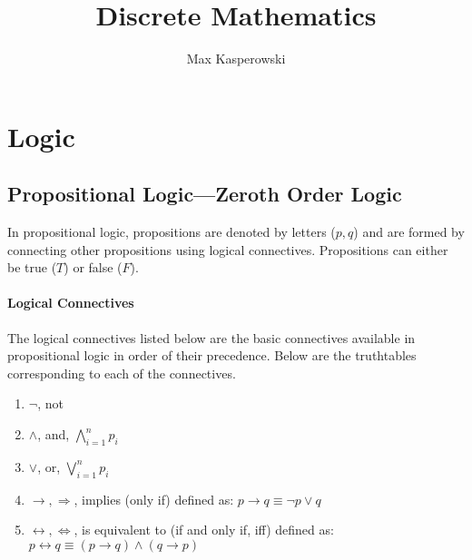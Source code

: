 \documentclass[a4paper, 10pt]{article}
\title{Discrete Mathematics}
\author{Max Kasperowski}
\begin{document}
\maketitle
\tableofcontents

\newpage
\section{Logic}

\subsection[Propositional Logic]{Propositional Logic{\large ---Zeroth Order Logic}}
In propositional logic, propositions are denoted by letters (\(p, q\)) and are formed by connecting other propositions using logical connectives. Propositions can either be true (\(T\)) or false (\(F\)).
\paragraph{Logical Connectives}
The logical connectives listed below are the basic connectives available in propositional logic in order of their precedence. Below are the truthtables corresponding to each of the connectives.
\begin{enumerate}
    \item \( \neg \), not
    \item \( \land \), and, \( \bigwedge\limits_{i=1}^n p_i \)
    \item \( \lor \), or, \( \bigvee\limits_{i=1}^n p_i \)
    \item \( \rightarrow ,\Rightarrow \), implies (only if) defined as: \( p\rightarrow q \equiv \neg p\lor q \)
    \item \( \leftrightarrow ,\Leftrightarrow \), is equivalent to (if and only if, iff) defined as: \(p\leftrightarrow q \equiv (p\rightarrow q)\land (q\rightarrow p) \)
\end{enumerate}
\end{document}
